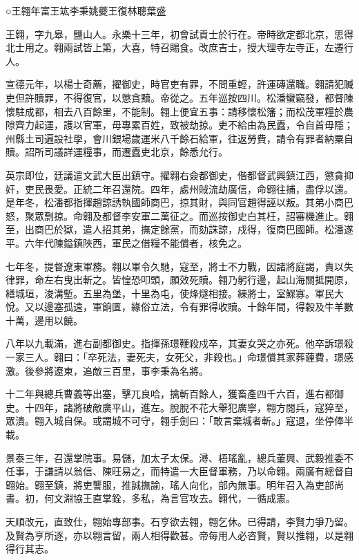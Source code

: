 
\begin{pinyinscope}
○王翱年富王竑李秉姚夔王復林聰葉盛

王翱，字九皋，鹽山人。永樂十三年，初會試貢士於行在。帝時欲定都北京，思得北士用之。翱兩試皆上第，大喜，特召賜食。改庶吉士，授大理寺左寺正，左遷行人。

宣德元年，以楊士奇薦，擢御史，時官吏有罪，不問重輕，許運磚還職。翱請犯贓吏但許贖罪，不得復官，以懲貪黷。帝從之。五年巡按四川。松潘蠻竊發，都督陳懷駐成都，相去八百餘里，不能制。翱上便宜五事：請移懷松籓；而松茂軍糧於農隙齊力起運，護以官軍，毋專累百姓，致被劫掠。吏不給由為民蠹，令自首毋隱；州縣土司遍設社學，會川銀場歲運米八千餘石給軍，往返勞費，請令有罪者納粟自贖。詔所司議詳運糧事，而遷蠹吏北京，餘悉允行。

英宗即位，廷議遣文武大臣出鎮守。擢翱右僉都御史，偕都督武興鎮江西，懲貪抑奸，吏民畏愛。正統二年召還院。四年，處州賊流劫廣信，命翱往捕，盡俘以還。是年冬，松潘都指揮趙諒誘執國師商巴，掠其財，與同官趙得誣以叛。其弟小商巴怒，聚眾剽掠。命翱及都督李安軍二萬征之。而巡按御史白其枉，詔審機進止。翱至，出商巴於獄，遣人招其弟，撫定餘黨，而劾誅諒，戍得，復商巴國師。松潘遂平。六年代陳鎰鎮陜西，軍民之借糧不能償者，核免之。

七年冬，提督遼東軍務。翱以軍令久馳，寇至，將士不力戰，因諸將庭謁，責以失律罪，命左右曳出斬之。皆惶恐叩頭，願效死贖。翱乃躬行邊，起山海關抵開原，繕城垣，浚溝塹。五里為堡，十里為屯，使烽燧相接。練將士，室鰥寡。軍民大悅。又以邊塞孤遠，軍餉匱，緣俗立法，令有罪得收贖。十餘年間，得穀及牛羊數十萬，邊用以饒。

八年以九載滿，進右副都御史。指揮孫璟鞭殺戍卒，其妻女哭之亦死。他卒訴璟殺一家三人。翱曰：「卒死法，妻死夫，女死父，非殺也。」命璟償其家葬薶費，璟感激。後參將遼東，追敵三百里，事李秉為名將。

十二年與總兵曹義等出塞，擊兀良哈，擒斬百餘人，獲畜產四千六百，進右都御史。十四年，諸將破敵廣平山，進左。脫脫不花大舉犯廣寧，翱方閱兵，寇猝至，眾潰。翱入城自保。或謂城不可守，翱手劍曰：「敢言棄城者斬。」寇退，坐停俸半載。

景泰三年，召還掌院事。易儲，加太子太保。潯、梧瑤亂，總兵董興、武毅推委不任事，于謙請以翁信、陳旺易之，而特遣一大臣督軍務，乃以命翱。兩廣有總督自翱始。翱至鎮，將吏讋服，推誠撫諭，瑤人向化，部內無事。明年召入為吏部尚書。初，何文淵協王直掌銓，多私，為言官攻去。翱代，一循成憲。

天順改元，直致仕，翱始專部事。石亨欲去翱，翱乞休。已得請，李賢力爭乃留。及賢為亨所逐，亦以翱言留，兩人相得歡甚。帝每用人必咨賢，賢以推翱，以是翱得行其志。


\end{pinyinscope}
